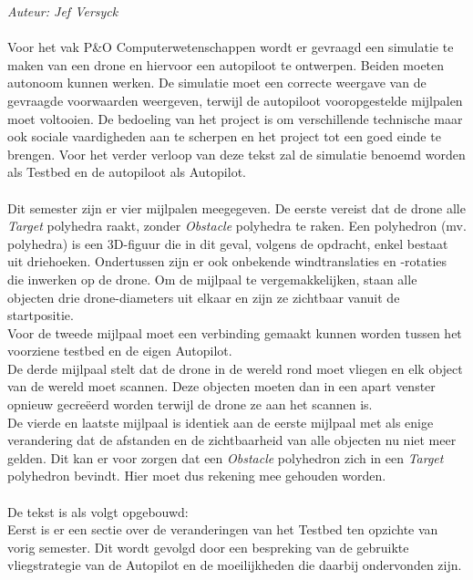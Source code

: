 {\em Auteur: Jef Versyck}
\\\\
Voor het vak P\&O Computerwetenschappen wordt er gevraagd een simulatie te maken van een drone en hiervoor een autopiloot te ontwerpen. Beiden moeten autonoom kunnen werken. De simulatie moet een correcte weergave van de gevraagde voorwaarden weergeven, terwijl de autopiloot vooropgestelde mijlpalen moet voltooien. De bedoeling van het project is om verschillende technische maar ook sociale vaardigheden aan te scherpen en het project tot een goed einde te brengen.
Voor het verder verloop van deze tekst zal de simulatie benoemd worden als Testbed en de autopiloot als Autopilot.
\\
\\
\noindent
Dit semester zijn er vier mijlpalen meegegeven. De eerste vereist dat de drone alle \textit{Target} polyhedra raakt, zonder \textit{Obstacle} polyhedra te raken. Een polyhedron (mv. polyhedra) is een 3D-figuur die in dit geval, volgens de opdracht, enkel bestaat uit driehoeken. Ondertussen zijn er ook onbekende windtranslaties en -rotaties die inwerken op de drone. Om de mijlpaal te vergemakkelijken, staan alle objecten drie drone-diameters uit elkaar en zijn ze zichtbaar vanuit de startpositie. \\
Voor de tweede mijlpaal moet een verbinding gemaakt kunnen worden tussen het voorziene testbed en de eigen Autopilot.\\
De derde mijlpaal stelt dat de drone in de wereld rond moet vliegen en elk object van de wereld moet scannen. Deze objecten moeten dan in een apart venster opnieuw gecre\"eerd worden terwijl de drone ze aan het scannen is. \\
De vierde en laatste mijlpaal is identiek aan de eerste mijlpaal met als enige verandering dat de afstanden en de zichtbaarheid van alle objecten nu niet meer gelden. Dit kan er voor zorgen dat een \textit{Obstacle} polyhedron zich in een \textit{Target} polyhedron bevindt. Hier moet dus rekening mee gehouden worden.
\noindent
\\
\\
De tekst is als volgt opgebouwd:\\
Eerst is er een sectie over de veranderingen van het Testbed ten opzichte van vorig semester. Dit wordt gevolgd door een bespreking van de gebruikte vliegstrategie van de Autopilot en de moeilijkheden die daarbij ondervonden zijn. 
